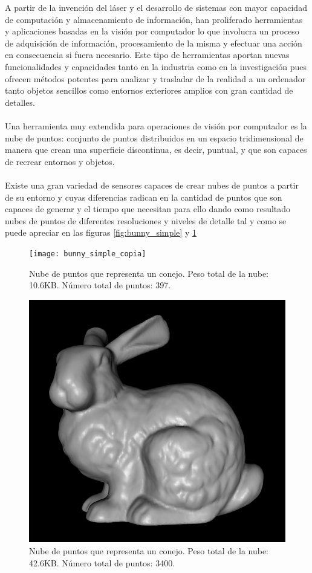 \documentclass[a4paper,11pt]{book}
\begin{document}
A partir de la invención del láser y el desarrollo de sistemas con mayor capacidad de computación y almacenamiento de información, han proliferado   herramientas y aplicaciones basadas en la visión por computador lo que involucra un proceso de adquisición de información, procesamiento de la misma y efectuar una acción en consecuencia si fuera necesario. Este tipo de herramientas aportan nuevas funcionalidades y capacidades tanto en la industria como en la investigación pues ofrecen métodos potentes para analizar y trasladar de la realidad a un ordenador tanto objetos sencillos como entornos exteriores amplios con gran cantidad de detalles.
\\
\\
Una herramienta muy extendida para operaciones de visión por computador es la nube de puntos: conjunto de puntos distribuidos en un espacio tridimensional de manera que crean una superficie discontinua, es decir, puntual, y que son capaces de recrear entornos y objetos. 
\\
\\
Existe una gran variedad de sensores capaces de crear nubes de puntos a partir de su entorno y cuyas diferencias radican en la cantidad de puntos que son capaces de generar y el tiempo que necesitan para ello dando como resultado nubes de puntos de diferentes resoluciones y niveles de detalle tal y como se puede apreciar en las figuras \ref{fig:bunny_simple} y \ref{fig:bunny}

\begin{figure}[!htb]
  \texttt{[image: bunny\_simple\_copia]}
  \caption{Nube de puntos que representa un conejo.
  Peso total de la nube: 10.6KB.
  Número total de puntos: 397.}\label{fig:bunny_simple}
\endminipage\hfill
{}
  \includegraphics[scale=0.35]{bunny}
  \caption{Nube de puntos que representa un conejo.
  Peso total de la nube: 42.6KB.
  Número total de puntos: 3400.}\label{fig:bunny}
\endminipage\hfill
\end{figure}
\end{document}
